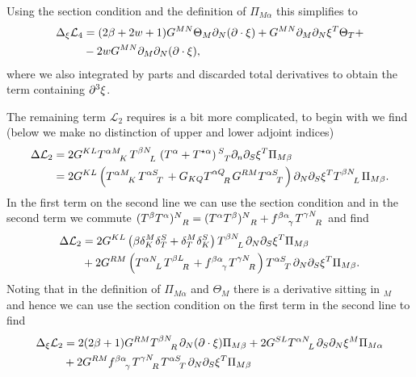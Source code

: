 Using the section condition and the definition of $\Pi_{M\alpha}$ this simplifies to 
\begin{equation}
    \begin{aligned}
    \Delta_\xi \mathcal{L}_4 &= (2\beta+2w+1)G^{MN}\Theta_M\partial_N(\partial\cdot\xi)+G^{MN}\partial_M\partial_N\xi^T\Theta_T+\\
    &-2wG^{MN}\partial_M\partial_N(\partial\cdot\xi),
    \end{aligned}
\end{equation}
where we also integrated by parts and discarded total derivatives to obtain the term containing $\partial^3\xi$. 

The remaining term $\mathcal{L}_2$ requires is a bit more complicated, to begin with we find (below we make no distinction of upper and lower adjoint indices)
\begin{equation}
    \begin{aligned}
    \Delta \mathcal{L}_2 &= 2G^{KL}\tensor{T}{^{\alpha M}_K}\tensor{T}{^{\beta N}_L}\left(T^\alpha+T^{\star\alpha}\right)\tensor{}{^S_T}\pd_n\pd_S\xi^T\Pi_{M\beta}\\
    &= 2G^{KL}\left(\tensor{T}{^{\alpha M}_K}\tensor{T}{^{\alpha S}_T}+G_{KQ}\tensor{T}{^{\alpha Q}_R}G^{RM}\tensor{T}{^{\alpha S}_T}\right)\pd_N\pd_S\xi^T\tensor{T}{^{\beta N}_L}\Pi_{M\beta}.
    \end{aligned}
\end{equation}
In the first term on the second line we can use the section condition and in the second term we commute $(T^\beta T^\alpha)\tensor{}{^N_R} = (T^{\alpha}T^\beta)\tensor{}{^N_R}+\tensor{f}{^{\beta\alpha}_\gamma}\tensor{T}{^{\gamma N}_R}$ and find 
\begin{equation}
    \begin{aligned}
        \Delta \mathcal{L}_2 &= 2G^{KL}\left(\beta\delta^M_K\delta^S_T+\delta^M_T\delta^S_K\right)\tensor{T}{^{\beta N}_L}\pd_N\pd_S\xi^T\Pi_{M\beta}\\
        &+ 2G^{RM}\left(\tensor{T}{^{\alpha N}_L}\tensor{T}{^{\beta L}_R}+\tensor{f}{^{\beta\alpha}_\gamma}\tensor{T}{^{\gamma N}_R}\right)\tensor{T}{^{\alpha S}_T}\pd_N\pd_S\xi^T\Pi_{M\beta}.
    \end{aligned}
\end{equation}
Noting that in the definition of $\Pi_{M\alpha}$ and $\Theta_M$ there is a derivative sitting in $_M$ and hence we can use the section condition on the first term in the second line to find 
\begin{equation}\label{eq:Peter}
    \begin{aligned}
        \Delta_\xi \mathcal{L}_2 &= 2(2\beta+1)G^{RM}\tensor{T}{^{\beta N}_R}\pd_N(\pd\cdot\xi)\Pi_{M\beta}+2G^{SL}\tensor{T}{^{\alpha N}_L}\pd_S\pd_N\xi^M\Pi_{M\alpha}\\
        &+2G^{RM}\tensor{f}{^{\beta\alpha}_\gamma}\tensor{T}{^{\gamma N}_R}\tensor{T}{^{\alpha S}_T}\pd_N\pd_S\xi^T\Pi_{M\beta}
    \end{aligned}
\end{equation}
